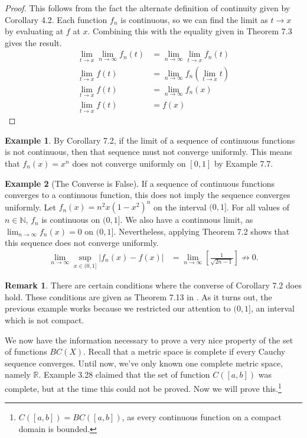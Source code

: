 \documentclass{article}
\newcommand{\N}{\mathbb{N}}
\newcommand{\R}{\mathbb{R}}
\theoremstyle{definition}
\newtheorem{example}{Example}[section]
\newtheorem{remark}{Remark}[section]
\begin{document}
\begin{proof}
	This follows from the fact the alternate definition of continuity given by Corollary 4.2. Each function $ f_n $ is continuous, so we can find the limit as $ t\to x $ by evaluating at $ f $ at $ x $. Combining this with the equality given in Theorem 7.3 gives the result. 
	\begin{align*}
		\lim\limits_{t\to x}\lim\limits_{n\to\infty}f_n(t)&=\lim\limits_{n\to\infty} \lim\limits_{t\to x}f_n(t)\\ 	\lim\limits_{t\to x}f(t)&=\lim\limits_{n\to\infty}f_n\left( \lim\limits_{t\to x} t\right)\\
		\lim\limits_{t\to x}f(t)&=\lim\limits_{n\to\infty}f_n\left(x\right)\\
		\lim\limits_{t\to x}f(t)&=f\left(x\right)
	\end{align*}
\end{proof}
\begin{example}
	By Corollary 7.2, if the limit of a sequence of continuous functions is not continuous, then that sequence must not converge uniformly. This means that $ f_n(x)=x^n $ does not converge uniformly on $ [0,1] $ by Example 7.7.
\end{example}
\begin{example}[The Converse is False]
If a sequence of continuous functions converges to a continuous function, this does not imply the sequence converges uniformly. Let $ f_n(x)=n^2x(1-x^2)^n $ on the interval $ (0,1] $. For all values of $ n\in\N $, $ f_n $ is continuous on $ (0,1] $. We also have a continuous limit, as $ \lim_{n\to\infty}f_n(x)=0 $ on $ (0,1] $. Nevertheless, applying Theorem 7.2 shows that this sequence does not converge uniformly. 
\begin{align*}
	\lim\limits_{n\to\infty}\sup_{x\in (0,1]}|f_n(x)-f(x)|&=\lim\limits_{n\to\infty}\left[\frac{1}{\sqrt{2n-1}}\right]\not\to 0.
\end{align*}
\begin{remark}
	There are certain conditions where the converse of Corollary 7.2 does hold. These conditions are given as Theorem 7.13 in \cite{rudin1964principles}. As it turns out, the previous example works because we restricted our attention to $ (0,1] $, an interval which is not compact. 
\end{remark}

We now have the information necessary to prove a very nice property of the set of functions $ BC(X) $. Recall that a metric space is complete if every Cauchy sequence converges. Until now, we've only known one complete metric space, namely $ \R $. Example 3.28 claimed that the set of function $ C([a,b]) $ was complete, but at the time this could not be proved. Now we will prove this.\footnote{$ C([a,b])=BC([a,b]) $, as every continuous function on a compact domain is bounded.}
 \end{example}
\end{document}

